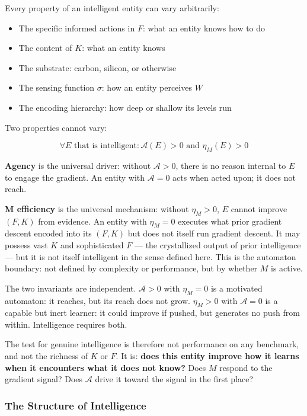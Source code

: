 \documentclass[
]{article}
\providecommand{\tightlist}{%
  \setlength{\itemsep}{0pt}\setlength{\parskip}{0pt}}
\begin{document}
Every property of an intelligent entity can vary arbitrarily:

\begin{itemize}
\tightlist
\item
  The specific informed actions in \(F\): what an entity knows how to do
\item
  The content of \(K\): what an entity knows
\item
  The substrate: carbon, silicon, or otherwise
\item
  The sensing function \(\sigma\): how an entity perceives \(W\)
\item
  The encoding hierarchy: how deep or shallow its levels run
\end{itemize}

Two properties cannot vary:

\[\forall E \text{ that is intelligent}: \mathcal{A}(E) > 0 \text{ and } \eta_M(E) > 0\]

\textbf{Agency} is the universal driver: without \(\mathcal{A} > 0\),
there is no reason internal to \(E\) to engage the gradient. An entity
with \(\mathcal{A} = 0\) acts when acted upon; it does not reach.

\textbf{M efficiency} is the universal mechanism: without
\(\eta_M > 0\), \(E\) cannot improve \((F, K)\) from evidence. An entity
with \(\eta_M = 0\) executes what prior gradient descent encoded into
its \((F, K)\) but does not itself run gradient descent. It may possess
vast \(K\) and sophisticated \(F\) --- the crystallized output of prior
intelligence --- but it is not itself intelligent in the sense defined
here. This is the automaton boundary: not defined by complexity or
performance, but by whether \(M\) is active.

The two invariants are independent. \(\mathcal{A} > 0\) with
\(\eta_M = 0\) is a motivated automaton: it reaches, but its reach does
not grow. \(\eta_M > 0\) with \(\mathcal{A} = 0\) is a capable but inert
learner: it could improve if pushed, but generates no push from within.
Intelligence requires both.

The test for genuine intelligence is therefore not performance on any
benchmark, and not the richness of \(K\) or \(F\). It is: \textbf{does
this entity improve how it learns when it encounters what it does not
know?} Does \(M\) respond to the gradient signal? Does \(\mathcal{A}\)
drive it toward the signal in the first place?

\subsubsection{The Structure of
Intelligence}\label{the-structure-of-intelligence}
\end{document}
